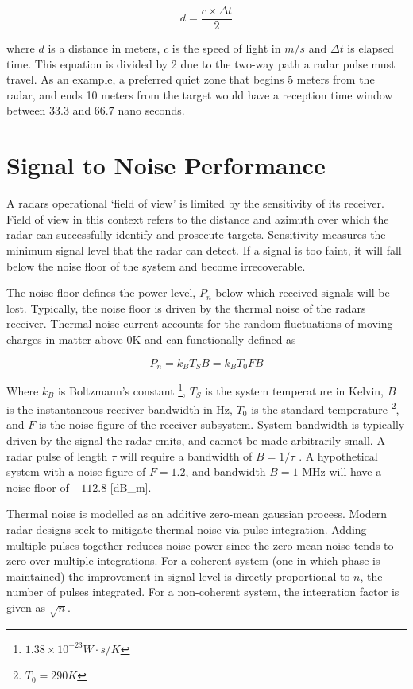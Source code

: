 			\begin{equation}
				d = \frac{c \times \Delta t}{2}
			\end{equation}

			where $d$ is a distance in meters, $c$ is the speed of light in $m/s$ and $\Delta t$ is elapsed time. This equation is divided by 2 due to the two-way path a radar pulse must travel. As an example, a preferred quiet zone that begins 5 meters from the radar, and ends  10 meters from the target would have a reception time window between $33.3$ and $66.7$ nano seconds.

\section{Signal to Noise Performance}

	A radars operational `field of view' is limited by the sensitivity of its receiver. Field of view in this context refers to the distance and azimuth over which the radar can successfully identify and prosecute targets. Sensitivity measures the minimum signal level that the radar can detect. If a signal is too faint, it will fall below the noise floor of the system  and become irrecoverable.

	The noise floor defines the power level, $P_n$ below which received signals will be lost. Typically, the noise floor is driven by the thermal noise of the radars receiver. Thermal noise current accounts for the random fluctuations of moving charges in matter above 0K and can functionally defined as

	\begin{equation}\label{eq:tnoise}
		P_n = k_B T_S B = k_B T_0 F B
	\end{equation}

	Where $k_B$ is Boltzmann's constant \footnote{$1.38\times10^{-23} W\cdot s / K$}, $T_S$ is the system temperature in Kelvin, $B$ is the instantaneous receiver bandwidth in Hz, $T_0$ is the standard temperature \footnote{$T_0 = 290 K$}, and $F$ is the noise figure of the receiver subsystem. System bandwidth is typically driven by the signal the radar emits, and cannot be made arbitrarily small. A radar pulse of length $\tau$ will require a bandwidth of $B = 1/\tau$ \cite{POMR_Noise}\cite{J_Noise}\cite{N_Noise}. A hypothetical system with a noise figure of $F = 1.2$, and bandwidth $B=1$ MHz will have a noise floor of $-112.8$ [dB\_m].

	Thermal noise is modelled as an additive zero-mean gaussian process. Modern radar designs seek to mitigate thermal noise via pulse integration. Adding multiple pulses together reduces noise power since the zero-mean noise tends to zero over multiple integrations. For a coherent system (one in which phase is maintained) the improvement in signal level is directly proportional to $n$, the number of pulses integrated. For a non-coherent system, the integration factor is given as $\sqrt{n}$.

